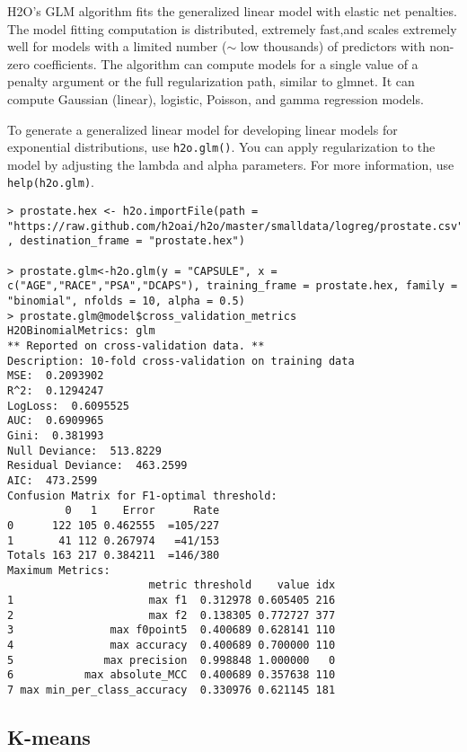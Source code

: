 {{H2O's GLM algorithm fits the generalized linear model with elastic net penalties. The model fitting computation is distributed, extremely fast,and scales extremely well for models with a limited number ($\sim$ low thousands) of predictors with non-zero coefficients. The algorithm can compute models for a single value of a penalty argument or the full regularization path, similar to glmnet. It can compute Gaussian (linear), logistic, Poisson, and gamma regression models.

To generate a generalized linear model for developing linear models for exponential distributions, use {\texttt{h2o.glm()}}. You can apply regularization to the model by adjusting the lambda and alpha parameters.
For more information, use {\texttt{help(h2o.glm)}}.

\waterExampleInR
\medskip

\begin{lstlisting}[style=R]
> prostate.hex <- h2o.importFile(path = "https://raw.github.com/h2oai/h2o/master/smalldata/logreg/prostate.csv" , destination_frame = "prostate.hex")

> prostate.glm<-h2o.glm(y = "CAPSULE", x = c("AGE","RACE","PSA","DCAPS"), training_frame = prostate.hex, family = "binomial", nfolds = 10, alpha = 0.5)
> prostate.glm@model$cross_validation_metrics
H2OBinomialMetrics: glm
** Reported on cross-validation data. **
Description: 10-fold cross-validation on training data
MSE:  0.2093902
R^2:  0.1294247
LogLoss:  0.6095525
AUC:  0.6909965
Gini:  0.381993
Null Deviance:  513.8229
Residual Deviance:  463.2599
AIC:  473.2599
Confusion Matrix for F1-optimal threshold:
         0   1    Error      Rate
0      122 105 0.462555  =105/227
1       41 112 0.267974   =41/153
Totals 163 217 0.384211  =146/380
Maximum Metrics:
                      metric threshold    value idx
1                     max f1  0.312978 0.605405 216
2                     max f2  0.138305 0.772727 377
3               max f0point5  0.400689 0.628141 110
4               max accuracy  0.400689 0.700000 110
5              max precision  0.998848 1.000000   0
6           max absolute_MCC  0.400689 0.357638 110
7 max min_per_class_accuracy  0.330976 0.621145 181
\end{lstlisting}


\subsection{K-means}

}}
